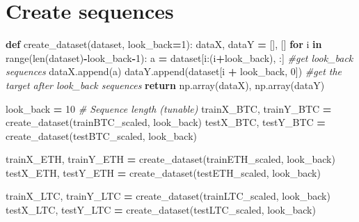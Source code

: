 \documentclass[
]{article}
\newenvironment{Shaded}{\begin{snugshade}}{\end{snugshade}}
\newcommand{\BuiltInTok}[1]{#1}
\newcommand{\CommentTok}[1]{\textcolor[rgb]{0.56,0.35,0.01}{\textit{#1}}}
\newcommand{\ControlFlowTok}[1]{\textcolor[rgb]{0.13,0.29,0.53}{\textbf{#1}}}
\newcommand{\DecValTok}[1]{\textcolor[rgb]{0.00,0.00,0.81}{#1}}
\newcommand{\KeywordTok}[1]{\textcolor[rgb]{0.13,0.29,0.53}{\textbf{#1}}}
\newcommand{\NormalTok}[1]{#1}
\newcommand{\OperatorTok}[1]{\textcolor[rgb]{0.81,0.36,0.00}{\textbf{#1}}}
\begin{document}
\section{Create sequences}\label{create-sequences}

\begin{Shaded}
\begin{Highlighting}[]
\KeywordTok{def}\NormalTok{ create\_dataset(dataset, look\_back}\OperatorTok{=}\DecValTok{1}\NormalTok{):}
\NormalTok{    dataX, dataY }\OperatorTok{=}\NormalTok{ [], []}
    \ControlFlowTok{for}\NormalTok{ i }\KeywordTok{in} \BuiltInTok{range}\NormalTok{(}\BuiltInTok{len}\NormalTok{(dataset)}\OperatorTok{{-}}\NormalTok{look\_back}\OperatorTok{{-}}\DecValTok{1}\NormalTok{):}
\NormalTok{        a }\OperatorTok{=}\NormalTok{ dataset[i:(i}\OperatorTok{+}\NormalTok{look\_back), :]  }\CommentTok{\#get look\_back sequences}
\NormalTok{        dataX.append(a)}
\NormalTok{        dataY.append(dataset[i }\OperatorTok{+}\NormalTok{ look\_back, }\DecValTok{0}\NormalTok{]) }\CommentTok{\#get the target after look\_back sequences}
    \ControlFlowTok{return}\NormalTok{ np.array(dataX), np.array(dataY)}
\end{Highlighting}
\end{Shaded}

\begin{Shaded}
\begin{Highlighting}[]
\NormalTok{look\_back }\OperatorTok{=} \DecValTok{10}  \CommentTok{\# Sequence length (tunable)}
\NormalTok{trainX\_BTC, trainY\_BTC }\OperatorTok{=}\NormalTok{ create\_dataset(trainBTC\_scaled, look\_back)}
\NormalTok{testX\_BTC, testY\_BTC }\OperatorTok{=}\NormalTok{ create\_dataset(testBTC\_scaled, look\_back)}

\NormalTok{trainX\_ETH, trainY\_ETH }\OperatorTok{=}\NormalTok{ create\_dataset(trainETH\_scaled, look\_back)}
\NormalTok{testX\_ETH, testY\_ETH }\OperatorTok{=}\NormalTok{ create\_dataset(testETH\_scaled, look\_back)}

\NormalTok{trainX\_LTC, trainY\_LTC }\OperatorTok{=}\NormalTok{ create\_dataset(trainLTC\_scaled, look\_back)}
\NormalTok{testX\_LTC, testY\_LTC }\OperatorTok{=}\NormalTok{ create\_dataset(testLTC\_scaled, look\_back)}
\end{Highlighting}
\end{Shaded}
\end{document}
